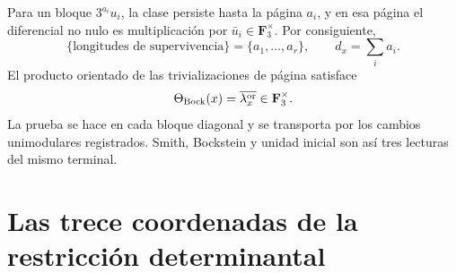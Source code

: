 Para un bloque \(3^{a_i}u_i\), la clase persiste hasta la página \(a_i\),
y en esa página el diferencial no nulo es multiplicación por
\(\bar u_i\in\mathbf F_3^\times\). Por consiguiente,
\begin{equation}\label{eq:detint-bock-longitudes}
 \{\text{longitudes de supervivencia}\}=\{a_1,\ldots,a_r\},
 \qquad
 d_x=\sum_i a_i.
\end{equation}
El producto orientado de las trivializaciones de página satisface
\begin{equation}\label{eq:detint-bock-leading}
 \Theta_{\rm Bock}(x)=\overline{\lambda_x^{\rm or}}
 \in\mathbf F_3^\times.
\end{equation}
La prueba se hace en cada bloque diagonal y se transporta por los cambios
unimodulares registrados. Smith, Bockstein y unidad inicial son así tres
lecturas del mismo terminal.

\section{Las trece coordenadas de la restricción determinantal}

